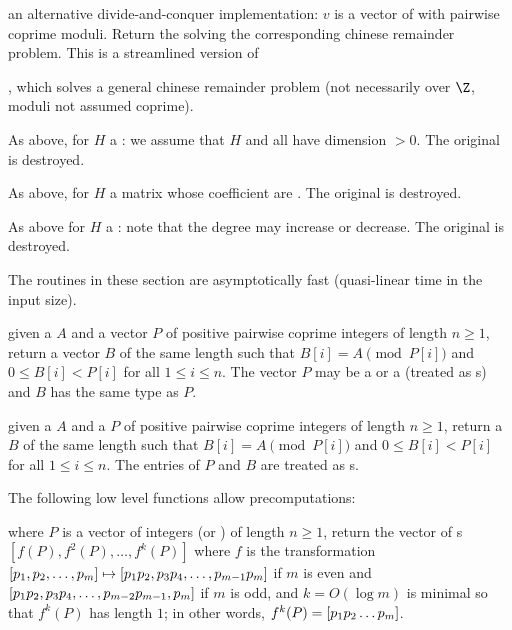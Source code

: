  an alternative divide-and-conquer
implementation: $v$ is a vector of  with pairwise coprime moduli.
Return the  solving the corresponding chinese remainder problem.
This is a streamlined version of

, which solves a general chinese remainder problem
(not necessarily over $\Z$, moduli not assumed coprime).

As above, for $H$ a : we assume that $H$ and all  have
dimension $> 0$. The original  is destroyed.



As above, for $H$ a matrix whose coefficient are .
The original  is destroyed.



As above for $H$ a : note that the degree may increase or decrease.
The original  is destroyed.




The routines in these section are asymptotically fast (quasi-linear time in
the input size).

 given a  $A$ and a vector $P$ of
positive pairwise coprime integers of length $n\ge 1$, return a vector $B$ of
the same length such that $B[i] = A\pmod{P[i]}$ and $0\leq B[i] < P[i]$ for
all $1\leq i\leq n$. The vector $P$ may be a  or a 
(treated as s) and $B$ has the same type as $P$.

 given a  $A$ and a 
$P$ of positive pairwise coprime integers of length $n\ge 1$, return a
 $B$ of the same length such that $B[i]=A\pmod{P[i]}$ and
$0\leq B[i] < P[i]$ for all $1\leq i\leq n$. The entries of $P$ and $B$ are
treated as s.

The following low level functions allow precomputations:

 where $P$ is a vector of integers (or
) of length $n\ge 1$, return the vector of s
$[f(P),f^2(P),\ldots,f^k(P)]$ where $f$ is the transformation
$[p_1,p_2,\ldots,p_m] \mapsto [p_1\*p_2,p_3\*p_4,\ldots,p_{m-1}\*p_m]$ if $m$
is even and $[p_1\*p_2,p_3\*p_4,\ldots,p_{m-2}\*p_{m-1},p_m]$ if $m$ is odd,
and $k = O(\log m)$ is minimal so that $f^k(P)$ has length $1$; in other
words, $f^k(P) = [p_1\*p_2\*\ldots\*p_m]$.

